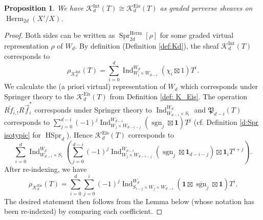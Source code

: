 \documentclass[reqno]{amsart}
\numberwithin{equation}{section}
\newcommand{\sgn}{\operatorname{sgn}}
\newcommand{\ol}[1]{\overline{#1}}
\newcommand{\Cal}[1]{\mathcal{#1}}
\newcommand{\mbf}[1]{\mathbf{#1}}
\DeclareMathOperator{\Ind}{Ind}
\DeclareMathOperator{\Eis}{Eis}
\DeclareMathOperator{\Herm}{Herm}
\DeclareMathOperator{\Spr}{Spr}
\DeclareMathOperator{\HSpr}{HSpr}
\DeclareMathOperator{\Int}{Int}
\newcommand{\bt}{\boxtimes}
\newcommand\one{\mathbf{1}}
\newcommand{\oll}[1]{\overleftarrow{#1}}
\newcommand{\orr}[1]{\overrightarrow{#1}}
\renewcommand{\r}{\rho}
\newcommand\cK{\mathcal{K}}
\newcommand\frP{\mathfrak{P}}
\newtheorem{prop}[thm]{Proposition}
\theoremstyle{remark}
\numberwithin{equation}{section}
\begin{document}
\begin{prop}
We have $ \Cal{K}^{\Int}_{d}(T) \cong \cK_{d}^{\Eis}(T)$ as graded perverse sheaves  on $\Herm_{2d}(X'/X)$.
\end{prop}
\begin{proof} Both sides can be written as $\Spr^{\Herm}_{2d}[\r]$ for some graded virtual representation $\r$ of $W_{d}$. By definition (Definition \ref{def:Kd}), the sheaf $\cK^{\Int}_{d}(T)$ corresponds to 
\[
\r_{\cK_{d}^{\Int}}(T)=\sum_{i=0}^{d} \Ind_{W_i \times W_{d-i}}^{W_d} (\chi_i \boxtimes 1) T^{i}.
\]
We calculate the (a priori virtual) representation of $W_d$ which corresponds under Springer theory to the $\cK_{d}^{\Eis}(T)$ from Definition \ref{def: K_Eis}. The operation $R\oll{f}_{i,!}R\orr{f}^{*}_{i}$ corresponds under Springer theory to $\Ind_{W_{d-i} \times S_i}^{W_d}$ and $\frP_{d-i}(T)$ corresponds to $\sum_{j=0}^{d-i} (-1)^j \Ind_{W_j \times W_{d-i-j}}^{W_{d-i}} (\sgn_j \boxtimes \mbf{1}) T^j$ (cf. Definition \ref{d:Spr isotypic}  for $\HSpr_{d}$). Hence $
\cK_{d}^{\Eis}(T)$ corresponds to 
\[
\sum_{i=0}^d \Ind_{W_{d-i} \times S_i}^{W_d} \left( \sum_{j=0}^{d-i}(-1)^j  \Ind_{W_j \times W_{d-i-j}}^{W_{d-i}}(\sgn_j \boxtimes \one_{d-i-j}) \boxtimes \one_i T^{i+j} \right) .
\]
After re-indexing, we have
\[
\r_{\cK_{d}^{\Eis}}(T)=\sum_{i=0}^{d} \sum_{j=0}^{i}(-1)^j\Ind_{S_{i-j} \times W_j \times W_{d-i}}^{W_d} (\one \bt \ol{\sgn}_{j} \bt \one ) T^{i}.
\]
The desired statement then follows from the Lemma below (whose notation has been re-indexed) by comparing each coefficient.
\end{proof}
\end{document}
